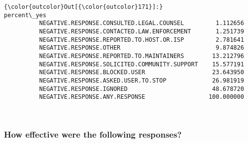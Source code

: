 \documentclass[11pt]{article}
\begin{document}
            \begin{Verbatim}[commandchars=\\\{\}]
{\color{outcolor}Out[{\color{outcolor}171}]:}                                                percent\_yes
          NEGATIVE.RESPONSE.CONSULTED.LEGAL.COUNSEL         1.112656
          NEGATIVE.RESPONSE.CONTACTED.LAW.ENFORCEMENT       1.251739
          NEGATIVE.RESPONSE.REPORTED.TO.HOST.OR.ISP         2.781641
          NEGATIVE.RESPONSE.OTHER                           9.874826
          NEGATIVE.RESPONSE.REPORTED.TO.MAINTAINERS        13.212796
          NEGATIVE.RESPONSE.SOLICITED.COMMUNITY.SUPPORT    15.577191
          NEGATIVE.RESPONSE.BLOCKED.USER                   23.643950
          NEGATIVE.RESPONSE.ASKED.USER.TO.STOP             26.981919
          NEGATIVE.RESPONSE.IGNORED                        48.678720
          NEGATIVE.RESPONSE.ANY.RESPONSE                  100.000000
\end{Verbatim}
        

    \begin{center}
    \end{center}
    { \hspace*{\fill} \\}
    

    \subsubsection{How effective were the following
responses?}\label{how-effective-were-the-following-responses}
\end{document}
